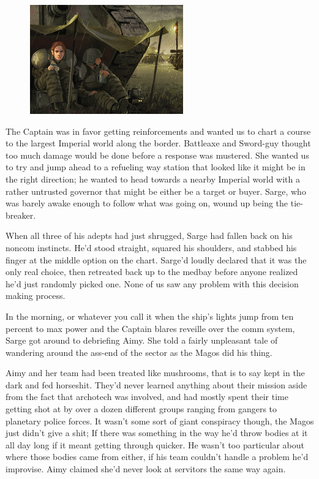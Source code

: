 \begin{figure}
	\begin{center}
		\includegraphics[width=\figwidth]{pics/11/37.png}
	\end{center}
\end{figure}
The Captain was in favor getting reinforcements and wanted us to chart a course to the largest Imperial world along the border. 
Battleaxe and Sword-guy thought too much damage would be done before a response was mustered. 
She wanted us to try and jump ahead to a refueling way station that looked like it might be in the right direction; 
he wanted to head towards a nearby Imperial world with a rather untrusted governor that might be either be a target or buyer. 
Sarge, who was barely awake enough to follow what was going on, wound up being the tie-breaker.

When all three of his adepts had just shrugged, Sarge had fallen back on his noncom instincts. 
He'd stood straight, squared his shoulders, and stabbed his finger at the middle option on the chart. 
Sarge'd loudly declared that it was the only real choice, then retreated back up to the medbay before anyone realized he'd just randomly picked one. 
None of us saw any problem with this decision making process.

In the morning, or whatever you call it when the ship's lights jump from ten percent to max power and the Captain blares reveille over the comm system, Sarge got around to debriefing Aimy. 
She told a fairly unpleasant tale of wandering around the ass-end of the sector as the Magos did his thing. 


Aimy and her team had been treated like mushrooms, that is to say kept in the dark and fed horseshit. 
They'd never learned anything about their mission aside from the fact that archotech was involved, and had mostly spent their time getting shot at by over a dozen different groups ranging from gangers to planetary police forces. 
It wasn't some sort of giant conspiracy though, the Magos just didn't give a shit; 
If there was something in the way he'd throw bodies at it all day long if it meant getting through quicker. 
He wasn't too particular about where those bodies came from either, if his team couldn't handle a problem he'd improvise. 
Aimy claimed she'd never look at servitors the same way again.

